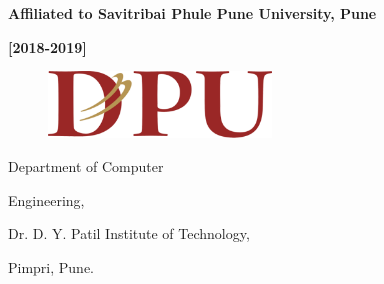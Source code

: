 \documentclass[12pt]{article}
\begin{document}
\begin{adjustwidth}{1.0in}{-0.47in}
\begin{justify}
{\fontsize{11pt}{13.2pt}\selectfont \textbf{Affiliated to Savitribai Phule Pune University, Pune}\par}
\end{justify}\par

\end{adjustwidth}

\begin{adjustwidth}{1.0in}{-0.5in}
\begin{justify}
{\fontsize{16pt}{19.2pt}\selectfont \textbf{[2018-2019]}\par}
\end{justify}\par

\end{adjustwidth}


\vspace{\baselineskip}
\setlength{\parskip}{9.96pt}



\newpage
\thispagestyle{empty}



{

\begin{figure}
\includegraphics[width=2.33in,height=0.7in]{./media/image2.png}
\end{figure}




{\fontsize{16pt}{19.2pt}\selectfont \textcolor[HTML]{1F497D}{ Department of Computer}\par}\par




{\fontsize{16pt}{19.2pt}\selectfont \textcolor[HTML]{1F497D}{Engineering,}\par}\par




\vspace{\baselineskip}
\begin{adjustwidth}{0.28in}{0.0in}
{\fontsize{15pt}{18.0pt}\selectfont \textcolor[HTML]{1F497D}{Dr. D. Y. Patil Institute of Technology,}{\fontsize{16pt}{19.2pt}\selectfont\par \textcolor[HTML]{1F497D}{Pimpri, Pune.}\par}\par}\par

\end{adjustwidth}
}
\end{document}
